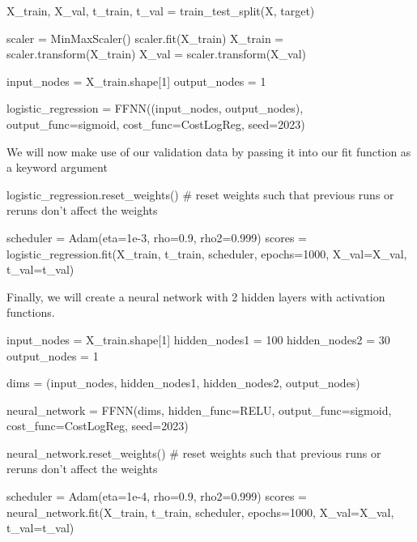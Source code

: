 \documentclass[%
oneside,                 %
final,                   %
10pt]{article}
\begin{document}
X_train, X_val, t_train, t_val = train_test_split(X, target)

scaler = MinMaxScaler()
scaler.fit(X_train)
X_train = scaler.transform(X_train)
X_val = scaler.transform(X_val)



\epycod








\bpycod
input_nodes = X_train.shape[1]
output_nodes = 1

logistic_regression = FFNN((input_nodes, output_nodes), output_func=sigmoid, cost_func=CostLogReg, seed=2023)


\epycod


We will now make use of our validation data by passing it into our fit function as a keyword argument








\bpycod
logistic_regression.reset_weights() # reset weights such that previous runs or reruns don't affect the weights

scheduler = Adam(eta=1e-3, rho=0.9, rho2=0.999)
scores = logistic_regression.fit(X_train, t_train, scheduler, epochs=1000, X_val=X_val, t_val=t_val)



\epycod


Finally, we will create a neural network with 2 hidden layers with activation functions.











\bpycod
input_nodes = X_train.shape[1]
hidden_nodes1 = 100
hidden_nodes2 = 30
output_nodes = 1

dims = (input_nodes, hidden_nodes1, hidden_nodes2, output_nodes)

neural_network = FFNN(dims, hidden_func=RELU, output_func=sigmoid, cost_func=CostLogReg, seed=2023)



\epycod








\bpycod
neural_network.reset_weights() # reset weights such that previous runs or reruns don't affect the weights

scheduler = Adam(eta=1e-4, rho=0.9, rho2=0.999)
scores = neural_network.fit(X_train, t_train, scheduler, epochs=1000, X_val=X_val, t_val=t_val)
\end{document}
